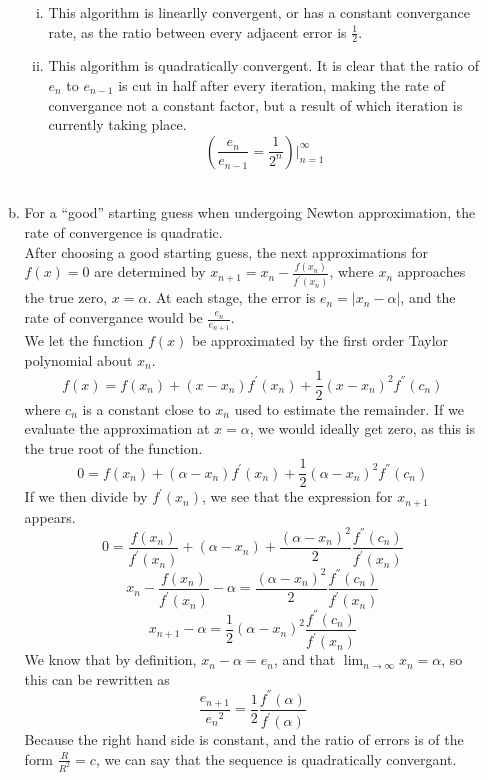 \documentclass[11pt]{article}
\begin{document}
\begin{enumerate}
\begin{enumerate}[(a)]
		\begin{enumerate}[(i)]

			\item This algorithm is linearlly convergent, or has a constant convergance rate, as the ratio between every adjacent
			error is $\frac{1}{2}$.

			\item This algorithm is quadratically convergent. It is clear that the ratio of $e_n$ to $e_{n-1}$ is cut in half
			after every iteration, making the rate of convergance not a constant factor, but a result of which iteration is
			currently taking place.
			$$(\frac{e_n}{e_{n-1}} = \frac{1}{2^n})|_{n=1}^{\infty}$$ \\

		\end{enumerate}

		\item For a ``good'' starting guess when undergoing Newton approximation, the rate of convergence is quadratic. \\

			After choosing a good starting guess, the next approximations for $f(x)=0$ are determined by $x_{n+1} = x_n-\frac{f(x_n)}{f^{'}(x_n)}$, where
			$x_n$ approaches the true zero, $x=\alpha$. At each stage, the error is $e_n = |x_n-\alpha|$, and the rate of convergance would be
			$\frac{e_n}{e_{n+1}}$. \\

			We let the function $f(x)$ be approximated by the first order Taylor polynomial about $x_n$.
			$$f(x) = f(x_n) + (x-x_n)f^{'}(x_n) + \frac{1}{2} (x-x_n)^2f^{''}(c_n)$$
			where $c_n$ is a constant close to $x_n$ used to estimate the remainder. If we evaluate the approximation at $x=\alpha$, we would ideally get zero,
			as this is the true root of the function.
			$$0 = f(x_n) + (\alpha - x_n)f^{'}(x_n) + \frac{1}{2} (\alpha-x_n)^2f^{''}(c_n)$$
			If we then divide by $f^{'}(x_n)$, we see that the expression for $x_{n+1}$ appears.
			$$0 = \frac{f(x_n)}{f^{'}(x_n)}+(\alpha-x_n) + \frac{(\alpha-x_n)^2}{2} \frac{f^{''}(c_n)}{f^{'}(x_n)} $$
			$$x_n - \frac{f(x_n)}{f^{'}(x_n)} - \alpha = \frac{(\alpha-x_n)^2}{2} \frac{f^{''}(c_n)}{f^{'}(x_n)} $$
			$$x_{n+1}-\alpha = \frac{1}{2} (\alpha - x_n)^2 \frac{f^{''}(c_n)}{f^{'}(x_n)} $$
			We know that by definition, $x_n-\alpha = e_n$, and that $\lim_{n\to\infty}x_n = \alpha$,  so this can be rewritten as
			$$\frac{e_{n+1}}{{e_n}^2} = \frac{1}{2}\frac{f^{''}(\alpha)}{f^{'}(\alpha)} $$
			Because the right hand side is constant, and the ratio of errors is of the form $\frac{R}{R^2} = c$, we can say that the sequence is
			quadratically convergant. \\


\end{enumerate}
\end{enumerate}
\end{document}

